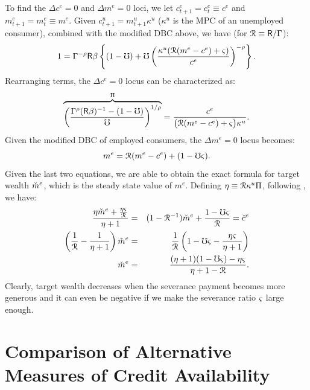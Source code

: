 \documentclass[titlepage]{\econtex}
\begin{document}
To find the $\Delta c^e=0$ and $\Delta m^e=0$ loci, we let
$c_{t+1}^e=c_t^e\equiv c^e$ and $m_{t+1}^e=m_{t}^e\equiv m^e$. Given
$c_{t+1}^u=m_{t+1}^u\kappa^u$ ($\kappa^u$ is the MPC of an unemployed
consumer), combined with the modified DBC above, we have (for $\mathcal{R}\equiv\mathsf{R}/\Gamma$):
\begin{equation*}
1 = \Gamma^{-\rho}\mathsf{R}\beta \left\{(1-\mho)+\mho \left(\frac{\kappa^{u}(\mathcal{R}(m^e-c^e)+\varsigma)}{c^{e}}\right)^{-\rho}\right\}.
\end{equation*}
Rearranging terms, the $\Delta c^e=0$ locus can be characterized as:
\begin{equation*}
\overbrace{\left(\frac{\Gamma^{\rho}(\mathsf{R}\beta)^{-1}-(1-\mho)}{\mho}\right)^{1/\rho}}^{\Pi}=\frac{c^e}{\big(\mathcal{R}(m^e-c^e)+\varsigma\big)\kappa^{u}}.
\end{equation*}
Given the modified DBC of employed consumers, the $\Delta m^e=0$ locus becomes:
\begin{equation*}
m^e=\mathcal{R}(m^e-c^e)+(1-\mho\varsigma).
\end{equation*}
Given the last two equations, we are able to obtain the exact formula for target wealth $\check{m}^{e}$, which is the steady state value of $m^e$. Defining $\eta \equiv \mathcal{R} \kappa^{u} \Pi$, following \cite{ctDiscrete},  we have:
\begin{eqnarray*}
\frac{\eta\check{m}^{e}+\frac{\eta\varsigma}{\mathcal{R}}}{\eta+1}&=&(1-\mathcal{R}^{-1})\check{m}^{e}+\frac{1-\mho\varsigma}{\mathcal{R}}=\check{c}^{e}\nonumber\\
\left(\frac{1}{\mathcal{R}}-\frac{1}{\eta+1}\right)\check{m}^{e} &=& \frac{1}{\mathcal{R}}\left(1-\mho\varsigma-\frac{\eta\varsigma}{\eta+1}\right)\nonumber\\
\check{m}^{e}&=& \frac{(\eta+1)(1-\mho\varsigma)-\eta\varsigma}{\eta+1-\mathcal{R}}.
\end{eqnarray*}
Clearly, target wealth decreases when the severance payment becomes more generous and it can even be negative if we make the severance ratio $\varsigma$ large enough.



\clearpage

\section{Comparison of Alternative Measures of Credit Availability}
\end{document}
